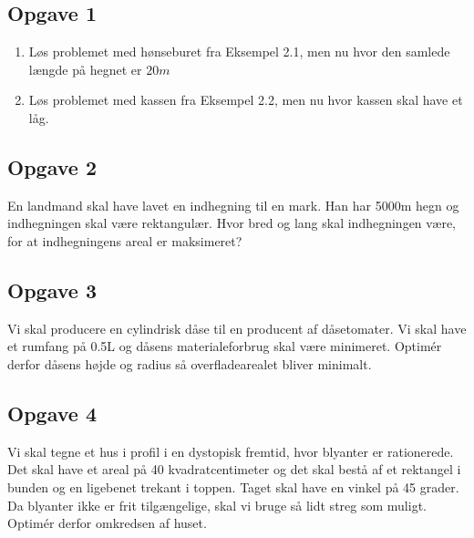 \subsection*{Opgave 1}
\begin{enumerate}[label=\roman*)]
\item Løs problemet med hønseburet fra Eksempel 2.1, men nu hvor den samlede længde på hegnet er $20m$
\item Løs problemet med kassen fra Eksempel 2.2, men nu hvor kassen skal have et låg.

\end{enumerate}

\subsection*{Opgave 2}
En landmand skal have lavet en indhegning til en mark. Han har 5000m hegn og indhegningen skal være rektangulær. Hvor bred og lang skal indhegningen være, for at indhegningens areal er maksimeret?

\subsection*{Opgave 3}
Vi skal producere en cylindrisk dåse til en producent af dåsetomater. Vi skal have et rumfang på 0.5L og dåsens materialeforbrug skal være minimeret. Optimér derfor dåsens højde og radius så overfladearealet bliver minimalt. 

\subsection*{Opgave 4}
Vi skal tegne et hus i profil i en dystopisk fremtid, hvor blyanter er rationerede. Det skal have et areal på 40 kvadratcentimeter og det skal bestå af et rektangel i bunden og en ligebenet trekant i toppen. Taget skal have en vinkel på 45 grader. Da blyanter ikke er frit tilgængelige, skal vi bruge så lidt streg som muligt. Optimér derfor omkredsen af huset. 
